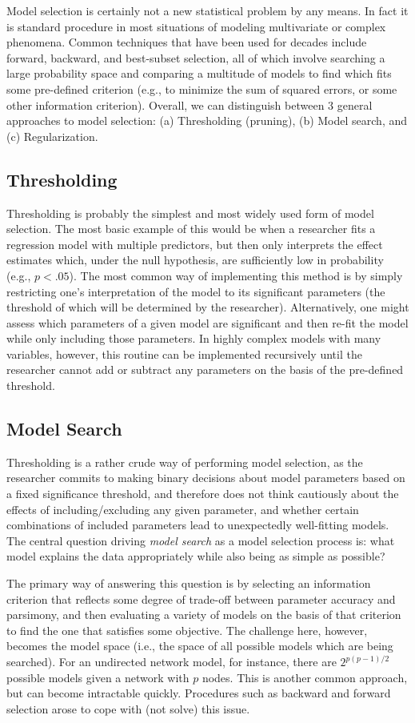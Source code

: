 Model selection is certainly not a new statistical problem by any means. In fact it is standard procedure in most situations of modeling multivariate or complex phenomena. Common techniques that have been used for decades include forward, backward, and best-subset selection, all of which involve searching a large probability space and comparing a multitude of models to find which fits some pre-defined criterion (e.g., to minimize the sum of squared errors, or some other information criterion). Overall, we can distinguish between 3 general approaches to model selection: (a) Thresholding (pruning), (b) Model search, and (c) Regularization.

\subsection{Thresholding}
Thresholding is probably the simplest and most widely used form of model selection. The most basic example of this would be when a researcher fits a regression model with multiple predictors, but then only interprets the effect estimates which, under the null hypothesis, are sufficiently low in probability (e.g., $p < .05$). The most common way of implementing this method is by simply restricting one's interpretation of the model to its significant parameters (the threshold of which will be determined by the researcher). Alternatively, one might assess which parameters of a given model are significant and then re-fit the model while only including those parameters. In highly complex models with many variables, however, this routine can be implemented recursively until the researcher cannot add or subtract any parameters on the basis of the pre-defined threshold.

\subsection{Model Search}
Thresholding is a rather crude way of performing model selection, as the researcher commits to making binary decisions about model parameters based on a fixed significance threshold, and therefore does not think cautiously about the effects of including/excluding any given parameter, and whether certain combinations of included parameters lead to unexpectedly well-fitting models. The central question driving \textit{model search} as a model selection process  is: what model explains the data appropriately while also being as simple as possible?

The primary way of answering this question is by selecting an information criterion that reflects some degree of trade-off between parameter accuracy and parsimony, and then evaluating a variety of models on the basis of that criterion to find the one that satisfies some objective. The challenge here, however, becomes the model space (i.e., the space of all possible models which are being searched). For an undirected network model, for instance, there are $2^{p(p - 1)/2}$ possible models given a network with $p$ nodes. This is another common approach, but can become intractable quickly. Procedures such as backward and forward selection arose to cope with (not solve) this issue. 

